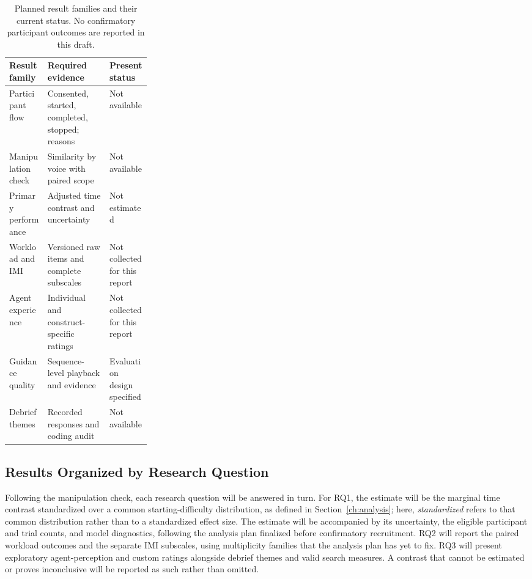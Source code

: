 \begin{table}[htbp]
\centering\caption{Planned result families and their current status. No confirmatory participant outcomes are reported in this draft.}
\small{}
\begin{tabularx}{\linewidth}{@{}p{0.27\linewidth}XX@{}}\toprule
Result family & Required evidence & Present status \\\midrule
Participant flow & Consented, started, completed, stopped; reasons & Not available \\
Manipulation check & Similarity by voice with paired scope & Not available \\
Primary performance & Adjusted time contrast and uncertainty & Not estimated \\
Workload and IMI & Versioned raw items and complete subscales & Not collected for this report \\
Agent experience & Individual and construct-specific ratings & Not collected for this report \\
Guidance quality & Sequence-level playback and evidence & Evaluation design specified \\
Debrief themes & Recorded responses and coding audit & Not available \\\bottomrule
\end{tabularx}
\end{table}


\subsection{Results Organized by Research Question}
Following the manipulation check, each research question will be answered in turn. For RQ1, the estimate will be the marginal time contrast standardized over a common starting-difficulty distribution, as defined in Section~\ref{ch:analysis}; here, \emph{standardized} refers to that common distribution rather than to a standardized effect size. The estimate will be accompanied by its uncertainty, the eligible participant and trial counts, and model diagnostics, following the analysis plan finalized before confirmatory recruitment. RQ2 will report the paired workload outcomes and the separate IMI subscales, using multiplicity families that the analysis plan has yet to fix. RQ3 will present exploratory agent-perception and custom ratings alongside debrief themes and valid search measures. A contrast that cannot be estimated or proves inconclusive will be reported as such rather than omitted.

